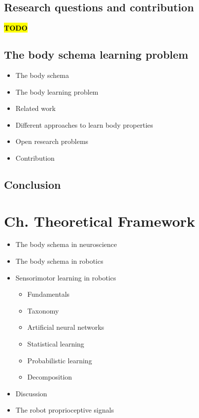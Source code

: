 \documentclass[12pt, a4paper]{article}
\newcommand{\TODO}{\hl{\textbf{TODO}}}
\begin{document}
\subsection*{Research questions and contribution}
\TODO


\subsection*{The body schema learning problem}
\begin{itemize}
	\item The body schema
	\item The body learning problem
	\item Related work
	\item Different approaches to learn body properties
	\item Open research problems
	\item Contribution
\end{itemize}

\subsection*{Conclusion}

\section*{Ch. Theoretical Framework}

\begin{itemize}
	\item The body schema in neuroscience
	\item The body schema in robotics
	\item Sensorimotor learning in robotics
	\begin{itemize}
		\item Fundamentals
		\item Taxonomy
		\item[] Artificial neural networks
		\item Statistical learning
		\item[] Probabilistic learning
		\item Decomposition
	\end{itemize}
	\item Discussion
	\item The robot proprioceptive signals
\end{itemize}
\end{document}
